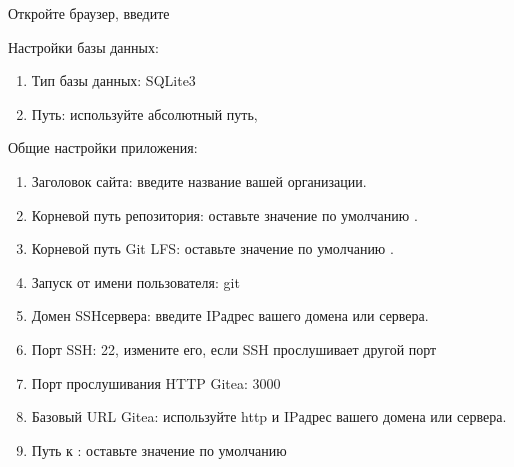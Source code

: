 \documentclass[a4paper,10pt,russian]{report}
\begin{document}
\sphinxAtStartPar
Откройте браузер, введите 

\sphinxAtStartPar
Настройки базы данных:
\begin{enumerate}
%
\item {} 
\sphinxAtStartPar
Тип базы данных: SQLite3

\item {} 
\sphinxAtStartPar
Путь: используйте абсолютный путь, 

\end{enumerate}

\sphinxAtStartPar
Общие настройки приложения:
\begin{enumerate}
%
\item {} 
\sphinxAtStartPar
Заголовок сайта: введите название вашей организации.

\item {} 
\sphinxAtStartPar
Корневой путь репозитория: оставьте значение по умолчанию  .

\item {} 
\sphinxAtStartPar
Корневой путь Git LFS: оставьте значение по умолчанию  .

\item {} 
\sphinxAtStartPar
Запуск от имени пользователя: git

\item {} 
\sphinxAtStartPar
Домен SSH\sphinxhyphen{}сервера: введите IP\sphinxhyphen{}адрес вашего домена или сервера.

\item {} 
\sphinxAtStartPar
Порт SSH: 22, измените его, если SSH прослушивает другой порт

\item {} 
\sphinxAtStartPar
Порт прослушивания HTTP Gitea: 3000

\item {} 
\sphinxAtStartPar
Базовый URL Gitea: используйте http и IP\sphinxhyphen{}адрес вашего домена или сервера.

\item {} 
\sphinxAtStartPar
Путь к  : оставьте значение по умолчанию 

\end{enumerate}
\end{document}
